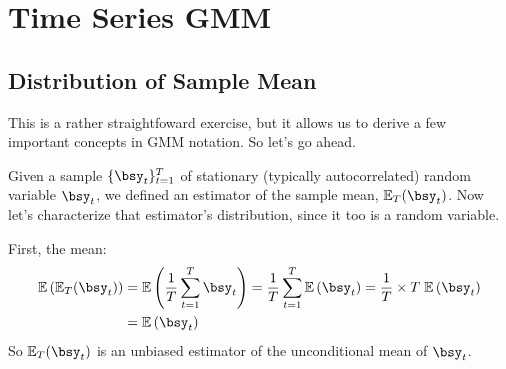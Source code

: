 \documentclass[12pt]{article}
\theoremstyle{plain}
\theoremstyle{definition}
\theoremstyle{remark}
\begin{document}
\clearpage
\section{Time Series GMM}

\subsection{Distribution of Sample Mean}
\label{sec:mean}

This is a rather straightfoward exercise, but it allows us to derive a
few important concepts in GMM notation. So let's go ahead.

Given a sample $\{\bsy_t\}^T_{t=1}$ of stationary (typically
autocorrelated) random variable $\bsy_t$, we defined an
estimator of the sample mean, $\mathbb{E}_T(\bsy_t)$. Now
let's characterize that estimator's distribution, since it too is a
random variable.

First, the mean:
\begin{align*}
  \mathbb{E}\left(\mathbb{E}_T(\bsy_t)\right)
  &= \mathbb{E}\left(\frac{1}{T}\sum^T_{t=1} \bsy_t\right)
  = \frac{1}{T}\sum^T_{t=1} \mathbb{E}\left(\bsy_t\right)
  = \frac{1}{T} \times T \; \mathbb{E}\left(\bsy_t\right)\\
  &= \mathbb{E}\left(\bsy_t\right)
\end{align*}
So $\mathbb{E}_T(\bsy_t)$ is an unbiased estimator of the
unconditional mean of $\bsy_t$.
\end{document}
